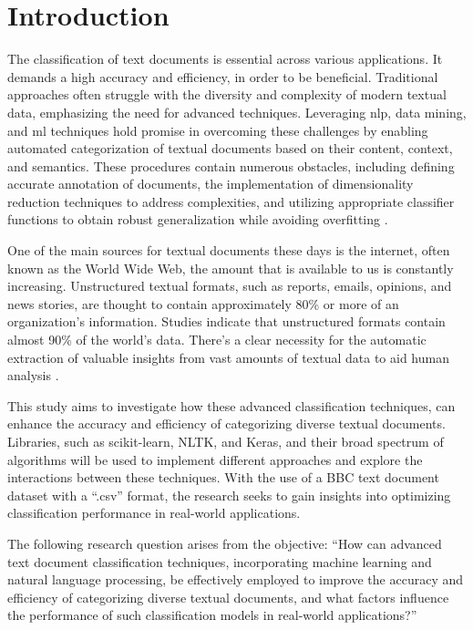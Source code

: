 \chapter{Introduction}

The classification of text documents is essential across various applications. It demands a high accuracy and efficiency, in order to be beneficial. Traditional approaches often struggle with the diversity and complexity of modern textual data, emphasizing the need for advanced techniques. Leveraging \ac{nlp}, data mining, and \ac{ml} techniques hold promise in overcoming these challenges by enabling automated categorization of textual documents based on their content, context, and semantics. These procedures contain numerous obstacles, including defining accurate annotation of documents, the implementation of dimensionality reduction techniques to address complexities, and utilizing appropriate classifier functions to obtain robust generalization while avoiding overfitting \citep{aurangzeb_review_2010}.

One of the main sources for textual documents these days is the internet, often known as the World Wide Web, the amount that is available to us is constantly increasing. Unstructured textual formats, such as reports, emails, opinions, and news stories, are thought to contain approximately 80\% or more of an organization's information. Studies indicate that unstructured formats contain almost 90\% of the world's data. There's a clear necessity for the automatic extraction of valuable insights from vast amounts of textual data to aid human analysis \citep{aurangzeb_review_2010}.

This study aims to investigate how these advanced classification techniques, can enhance the accuracy and efficiency of categorizing diverse textual documents. Libraries, such as scikit-learn, NLTK, and Keras, and their broad spectrum of algorithms will be used to implement different approaches and explore the interactions between these techniques. With the use of a BBC text document dataset with a “.csv” format, the research seeks to gain insights into optimizing classification performance in real-world applications.

The following research question arises from the objective: “How can advanced text document classification techniques, incorporating machine learning and natural language processing, be effectively employed to improve the accuracy and efficiency of categorizing diverse textual documents, and what factors influence the performance of such classification models in real-world applications?”

